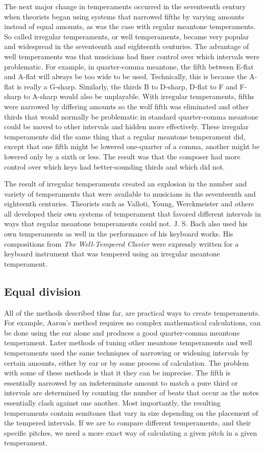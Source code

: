 The next major change in temperaments occurred in the seventeenth century when theorists
began using systems that narrowed fifths by varying amounts instead of equal amounts, as
was the case with regular meantone temperaments.  So called irregular temperaments, or
well temperaments, became very popular and widespread in the seventeenth and eighteenth
centuries.  The advantage of well temperaments was that musicians had finer control over
which intervals were problematic.  For example, in quarter-comma meantone, the fifth
between E-flat and A-flat will always be too wide to be used.  Technically, this is
because the A-flat is really a G-sharp. \autocite[35]{RD:1}  Similarly, the thirds B to
D-sharp, D-flat to F and F-sharp to A-sharp would also be unplayable.  With irregular
temperaments, fifths were narrowed by differing amounts so the wolf fifth was eliminated
and other thirds that would normally be problematic in standard quarter-comma meantone
could be moved to other intervals and hidden more effectively. These irregular
temperaments did the same thing that a regular meantone temperament did, except that one
fifth might be lowered one-quarter of a comma, another might be lowered only by a sixth or
less.  The result was that the composer had more control over which keys had
better-sounding thirds and which did not.

The result of irregular temperaments created an explosion in the number and variety of
temperaments that were available to musicians in the seventeenth and eighteenth centuries.
Theorists such as Valloti, Young, Werckmeister and others all developed their own systems
of temperament that favored different intervals in ways that regular meantone temperaments
could not.  J. S. Bach also used his own temperaments as well in the performance of his
keyboard works.  His compositions from \textit{The Well-Tempered Clavier} were expressly
written for a keyboard instrument that was tempered using an irregular meantone
temperament.

\subsection{Equal division}

All of the methods described thus far, are practical ways to create temperaments.
For example, Aaron's method requires no complex mathematical calculations, can be done
using the ear alone and produces a good quarter-comma meantone temperament.  Later methods
of tuning other meantone temperaments and well temperaments used the same techniques of
narrowing or widening intervals by certain amounts, either by ear or by some process of
calculation. The problem with some of these methods is that it they can be imprecise. The
fifth is essentially narrowed by an indeterminate amount to match a pure third or
intervals are determined by counting the number of beats that occur as the notes
essentially clash against one another.  Most importantly, the resulting temperaments
contain semitones that vary in size depending on the placement of the tempered intervals.
If we are to compare different temperaments, and their specific pitches, we need a more
exact way of calculating a given pitch in a given temperament.

